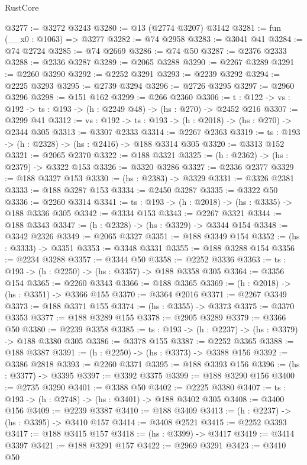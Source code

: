 \begin{lexlean}{RustCore}
\begin{coremodule}
@3277 := @3272 @3243
@3280 := @13 (@2774 @3207) @3142
@3281 := fun (__x0 : @1063) => @3277
@3282 := @74 @2958
@3283 := @3041 @41
@3284 := @74 @2724
@3285 := @74 @2669
@3286 := @74 @50
@3287 := @2376 @2333
@3288 := @2336 @3287
@3289 := @2065 @3288
@3290 := @2267 @3289
@3291 := @2260 @3290
@3292 := @2252 @3291
@3293 := @2239 @3292
@3294 := @2225 @3293
@3295 := @2739 @3294
@3296 := @2726 @3295
@3297 := @2960 @3296
@3298 := @151 @162
@3299 := @266 @2360
@3306 := {t : @122} -> {vs : @192} -> {ts : @193} -> (h : @2249 @48) -> (hs : @270) -> @2452 @216
@3307 := @3299 @41
@3312 := {vs : @192} -> {ts : @193} -> (h : @2018) -> (hs : @270) -> @2344 @305
@3313 := @3307 @2333
@3314 := @2267 @2363
@3319 := {ts : @193} -> (h : @2328) -> (hs : @2416) -> @188 @3314 @305
@3320 := @3313 @152
@3321 := @2065 @2370
@3322 := @188 @3321
@3325 := (h : @2362) -> (hs : @2379) -> @3322 @153
@3326 := @3320 @3286
@3327 := @2336 @2377
@3329 := @188 @3327 @153
@3330 := (hs : @2383) -> @3329
@3331 := @3326 @2381
@3333 := @188 @3287 @153
@3334 := @2450 @3287
@3335 := @3322 @50
@3336 := @2260 @3314
@3341 := {ts : @193} -> (h : @2018) -> (hs : @3335) -> @188 @3336 @305
@3342 := @3334 @153
@3343 := @2267 @3321
@3344 := @188 @3343
@3347 := (h : @2328) -> (hs : @3329) -> @3344 @154
@3348 := @3342 @2326
@3349 := @2065 @3327
@3351 := @188 @3349 @154
@3352 := (hs : @3333) -> @3351
@3353 := @3348 @3331
@3355 := @188 @3288 @154
@3356 := @2234 @3288
@3357 := @3344 @50
@3358 := @2252 @3336
@3363 := {ts : @193} -> (h : @2250) -> (hs : @3357) -> @188 @3358 @305
@3364 := @3356 @154
@3365 := @2260 @3343
@3366 := @188 @3365
@3369 := (h : @2018) -> (hs : @3351) -> @3366 @155
@3370 := @3364 @2016
@3371 := @2267 @3349
@3373 := @188 @3371 @155
@3374 := (hs : @3355) -> @3373
@3375 := @3370 @3353
@3377 := @188 @3289 @155
@3378 := @2905 @3289
@3379 := @3366 @50
@3380 := @2239 @3358
@3385 := {ts : @193} -> (h : @2237) -> (hs : @3379) -> @188 @3380 @305
@3386 := @3378 @155
@3387 := @2252 @3365
@3388 := @188 @3387
@3391 := (h : @2250) -> (hs : @3373) -> @3388 @156
@3392 := @3386 @2818
@3393 := @2260 @3371
@3395 := @188 @3393 @156
@3396 := (hs : @3377) -> @3395
@3397 := @3392 @3375
@3399 := @188 @3290 @156
@3400 := @2735 @3290
@3401 := @3388 @50
@3402 := @2225 @3380
@3407 := {ts : @193} -> (h : @2748) -> (hs : @3401) -> @188 @3402 @305
@3408 := @3400 @156
@3409 := @2239 @3387
@3410 := @188 @3409
@3413 := (h : @2237) -> (hs : @3395) -> @3410 @157
@3414 := @3408 @2521
@3415 := @2252 @3393
@3417 := @188 @3415 @157
@3418 := (hs : @3399) -> @3417
@3419 := @3414 @3397
@3421 := @188 @3291 @157
@3422 := @2969 @3291
@3423 := @3410 @50

\end{coremodule}
\end{lexlean}
